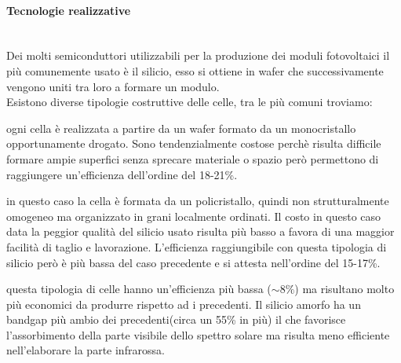 \paragraph{Tecnologie realizzative}\mbox{}\\
Dei molti semiconduttori utilizzabili per la produzione dei moduli fotovoltaici il più comunemente usato è il silicio, esso si ottiene in wafer che successivamente vengono uniti tra loro a formare un modulo.\\
Esistono diverse tipologie costruttive delle celle, tra le più comuni troviamo:
\begin{description}[labelindent=5mm]
    \item[$\cdot$ Silicio monocristallino:] ogni cella è realizzata a partire da un wafer formato da un monocristallo opportunamente drogato. Sono tendenzialmente costose perchè risulta difficile formare ampie superfici senza sprecare materiale o spazio però permettono di raggiungere un'efficienza dell'ordine del 18-21\%.
    \item[$\cdot$ Silicio policristallino:] in questo caso la cella è formata da un policristallo, quindi non strutturalmente omogeneo ma organizzato in grani localmente ordinati. Il costo in questo caso data la peggior qualità del silicio usato risulta più basso a favora di una maggior facilità di taglio e lavorazione. L'efficienza raggiungibile con questa tipologia di silicio però è più bassa del caso precedente e si attesta nell'ordine del 15-17\%. 
    \item[$\cdot$ Silicio amorfo:] questa tipologia di celle hanno un'efficienza più bassa ($\sim8\%$) ma risultano molto più economici da produrre rispetto ad i precedenti. Il silicio amorfo ha un bandgap più ambio dei precedenti(circa un 55\% in più) il che favorisce l'assorbimento della parte visibile dello spettro solare ma risulta meno efficiente nell'elaborare la parte infrarossa.
\end{description}
